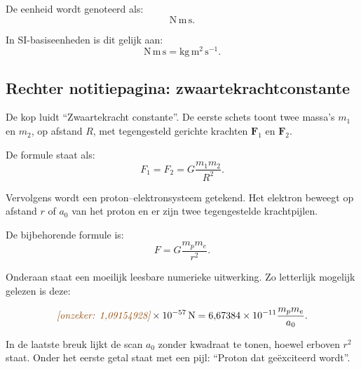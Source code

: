 \documentclass[11pt,a4paper]{article}
\newcommand{\uncertain}[1]{\textcolor{uncertain}{\textit{[onzeker: #1]}}}
\begin{document}
De eenheid wordt genoteerd als:
\[
\mathrm{N\,m\,s}.
\]

In SI-basiseenheden is dit gelijk aan:
\[
\mathrm{N\,m\,s}=\mathrm{kg\,m^2\,s^{-1}}.
\]

\newpage
\subsection*{Rechter notitiepagina: zwaartekrachtconstante}

De kop luidt ``Zwaartekracht constante''. De eerste schets toont twee massa's
$m_1$ en $m_2$, op afstand $R$, met tegengesteld gerichte krachten
$\mathbf{F}_1$ en $\mathbf{F}_2$.

\begin{center}
\end{center}

De formule staat als:
\[
F_1=F_2=G\frac{m_1m_2}{R^2}.
\]

Vervolgens wordt een proton--elektronsysteem getekend. Het elektron beweegt
op afstand $r$ of $a_0$ van het proton en er zijn twee tegengestelde
krachtpijlen.

\begin{center}
\end{center}

De bijbehorende formule is:
\[
F=G\frac{m_pm_e}{r^2}.
\]

Onderaan staat een moeilijk leesbare numerieke uitwerking. Zo letterlijk
mogelijk gelezen is deze:

\[
\uncertain{1{,}09154928}\times10^{-57}\,\mathrm{N}
=
6{,}67384\times10^{-11}
\frac{m_pm_e}{a_0}.
\]

\noindent
In de laatste breuk lijkt de scan $a_0$ zonder kwadraat te tonen, hoewel
erboven $r^2$ staat. Onder het eerste getal staat met een pijl:
``Proton dat geëxciteerd wordt''.
\end{document}
